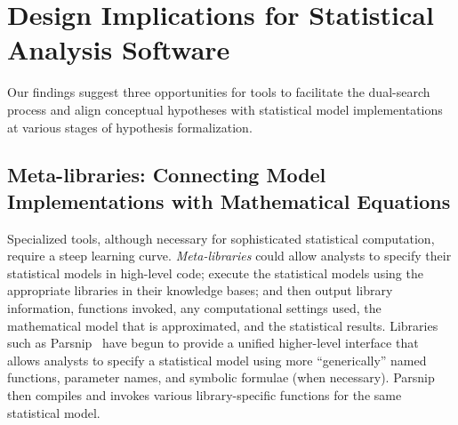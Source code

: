 \section{Design Implications for Statistical Analysis Software} \label{sec:implications}
Our findings suggest three opportunities for tools to facilitate the dual-search
process and align conceptual hypotheses with statistical model implementations
at various stages of hypothesis formalization. 

\subsection*{Meta-libraries: Connecting Model Implementations with Mathematical Equations}




Specialized tools, although necessary for sophisticated statistical computation,
require a steep learning curve. \textit{Meta-libraries} could allow analysts to
specify their statistical models in high-level code; execute the statistical models using the appropriate
libraries in their knowledge bases; and then output library information,
functions invoked, any computational settings used, the mathematical model that
is approximated, and the statistical results. Libraries such as
Parsnip~\cite{parsnip} have begun to provide a unified higher-level interface
that allows analysts to specify a statistical model using more ``generically''
named functions, parameter names, and symbolic formulae (when necessary).
Parsnip then compiles and invokes various library-specific functions for the
same statistical model.

